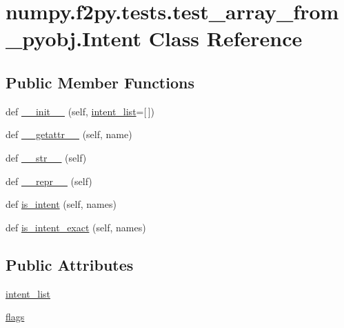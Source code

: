 \hypertarget{classnumpy_1_1f2py_1_1tests_1_1test__array__from__pyobj_1_1Intent}{}\section{numpy.\+f2py.\+tests.\+test\+\_\+array\+\_\+from\+\_\+pyobj.\+Intent Class Reference}
\label{classnumpy_1_1f2py_1_1tests_1_1test__array__from__pyobj_1_1Intent}
\subsection*{Public Member Functions}
\begin{DoxyCompactItemize}
\item 
def \hyperlink{classnumpy_1_1f2py_1_1tests_1_1test__array__from__pyobj_1_1Intent_afbc3b3e617679a72b90e8b719b51a10f}{\+\_\+\+\_\+init\+\_\+\+\_\+} (self, \hyperlink{classnumpy_1_1f2py_1_1tests_1_1test__array__from__pyobj_1_1Intent_ad29ce970d99d274f38b23af9713feb8d}{intent\+\_\+list}=\mbox{[}$\,$\mbox{]})
\item 
def \hyperlink{classnumpy_1_1f2py_1_1tests_1_1test__array__from__pyobj_1_1Intent_ae58fadf3f18bb2831083cc148ce1e674}{\+\_\+\+\_\+getattr\+\_\+\+\_\+} (self, name)
\item 
def \hyperlink{classnumpy_1_1f2py_1_1tests_1_1test__array__from__pyobj_1_1Intent_ae9878da7456943dacdb4b8bc790c46d0}{\+\_\+\+\_\+str\+\_\+\+\_\+} (self)
\item 
def \hyperlink{classnumpy_1_1f2py_1_1tests_1_1test__array__from__pyobj_1_1Intent_a7104eb7777e1b592f6e75735a7ad3660}{\+\_\+\+\_\+repr\+\_\+\+\_\+} (self)
\item 
def \hyperlink{classnumpy_1_1f2py_1_1tests_1_1test__array__from__pyobj_1_1Intent_af1b1a723436e3fbdf4d7f7dbeb160b2f}{is\+\_\+intent} (self, names)
\item 
def \hyperlink{classnumpy_1_1f2py_1_1tests_1_1test__array__from__pyobj_1_1Intent_ac7a2210085a9e5d863b3a14ca063b3dc}{is\+\_\+intent\+\_\+exact} (self, names)
\end{DoxyCompactItemize}
\subsection*{Public Attributes}
\begin{DoxyCompactItemize}
\item 
\hyperlink{classnumpy_1_1f2py_1_1tests_1_1test__array__from__pyobj_1_1Intent_ad29ce970d99d274f38b23af9713feb8d}{intent\+\_\+list}
\item 
\hyperlink{classnumpy_1_1f2py_1_1tests_1_1test__array__from__pyobj_1_1Intent_add74a178a89f893533cb5db8817aad5b}{flags}
\end{DoxyCompactItemize}



